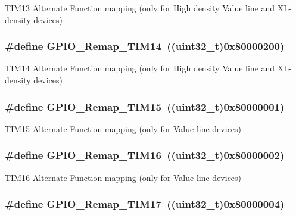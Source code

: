 \label{group__GPIO__Remap__define_ga72f5da86ed94f3be978cd841f7cd37cb}
TIM13 Alternate Function mapping (only for High density Value line and XL-\/density devices) \hypertarget{group__GPIO__Remap__define_gaa2ae554ed69ad3368c2cd7db678b3fd0}{
\subsubsection[{GPIO\_\-Remap\_\-TIM14}]{\setlength{\rightskip}{0pt plus 5cm}\#define GPIO\_\-Remap\_\-TIM14~((uint32\_\-t)0x80000200)}}
\label{group__GPIO__Remap__define_gaa2ae554ed69ad3368c2cd7db678b3fd0}
TIM14 Alternate Function mapping (only for High density Value line and XL-\/density devices) \hypertarget{group__GPIO__Remap__define_gaead5c447875e8b384945424845452b82}{
\subsubsection[{GPIO\_\-Remap\_\-TIM15}]{\setlength{\rightskip}{0pt plus 5cm}\#define GPIO\_\-Remap\_\-TIM15~((uint32\_\-t)0x80000001)}}
\label{group__GPIO__Remap__define_gaead5c447875e8b384945424845452b82}
TIM15 Alternate Function mapping (only for Value line devices) \hypertarget{group__GPIO__Remap__define_gac9d612f9f9f9f66faecbdbbc29d2ac61}{
\subsubsection[{GPIO\_\-Remap\_\-TIM16}]{\setlength{\rightskip}{0pt plus 5cm}\#define GPIO\_\-Remap\_\-TIM16~((uint32\_\-t)0x80000002)}}
\label{group__GPIO__Remap__define_gac9d612f9f9f9f66faecbdbbc29d2ac61}
TIM16 Alternate Function mapping (only for Value line devices) \hypertarget{group__GPIO__Remap__define_ga9fe98e01f8837d6a1ac4b4833f0fc45e}{
\subsubsection[{GPIO\_\-Remap\_\-TIM17}]{\setlength{\rightskip}{0pt plus 5cm}\#define GPIO\_\-Remap\_\-TIM17~((uint32\_\-t)0x80000004)}}
